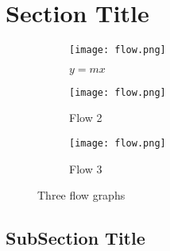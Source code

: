 \section{Section Title}
    \begin{figure}
        \centering
        \begin{subfigure}[b]{0.3\textwidth}
            \centering
            \texttt{[image: flow.png]}
            \caption{$y=mx$}
            \label{fig:y}
        \end{subfigure}
        \hfill
        \begin{subfigure}[b]{0.3\textwidth}
            \centering
            \texttt{[image: flow.png]}
            \caption{Flow 2}
            \label{flow:2}
        \end{subfigure}
        \hfill
        \begin{subfigure}[b]{0.3\textwidth}
            \centering
            \texttt{[image: flow.png]}
            \caption{Flow 3}
            \label{flow:3}
        \end{subfigure}
        \caption{Three flow graphs}
        \label{fig:three graphs}
    \end{figure}

    \subsection{SubSection Title}
